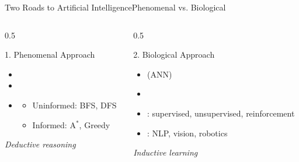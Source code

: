 \documentclass[aspectratio=169,11pt]{beamer}
\begin{document}
\begin{frame}{Two Roads to Artificial Intelligence}{Phenomenal vs. Biological}
  \begin{columns}[T]
    \begin{column}{0.5\textwidth}
      \begin{block}{1. Phenomenal Approach}
        \small
        \begin{itemize}
          \item {}
          \item {}
          \item {}
          \begin{itemize}\scriptsize
            \item Uninformed: BFS, DFS
            \item Informed: A$^\ast$, Greedy
          \end{itemize}
        \end{itemize}
        \centering\scriptsize\textit{Deductive reasoning}
      \end{block}
    \end{column}
    \begin{column}{0.5\textwidth}
      \begin{exampleblock}{2. Biological Approach}
        \small
        \begin{itemize}
          \item {} (ANN)
          \item {}
          \item {}: supervised, unsupervised, reinforcement
          \item {}: NLP, vision, robotics
        \end{itemize}
        \centering\scriptsize\textit{Inductive learning}
      \end{exampleblock}
    \end{column}
  \end{columns}
\end{frame}
\end{document}
